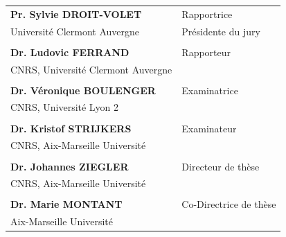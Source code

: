 \documentclass[
  a4paper,12pt,twoside,onecolumn,openright,final,oldfontcommands]{memoir}
\newcommand\titel[1]{{\usefont{T1}{tit}{el}{n} #1 }}
\begin{document}
\begin{center}
\begin{minipage}[t]{.6\linewidth}
	    \vspace{1em}
      \noindent\begin{tabular}{@{}p{16em} p{14em}}
        \textbf{Pr. Sylvie DROIT-VOLET} & Rapportrice\\
      	Université Clermont Auvergne & Présidente du jury\\
        \\
      	\textbf{Dr. Ludovic FERRAND} & Rapporteur\\
      	CNRS, Université Clermont Auvergne\\
        \\
      	\textbf{Dr. Véronique BOULENGER} & Examinatrice\\
      	CNRS, Université Lyon 2\\
      	\\
        \textbf{Dr. Kristof STRIJKERS} & Examinateur\\
      	CNRS, Aix-Marseille Université\\
        \\
      	\textbf{Dr. Johannes ZIEGLER} & Directeur de thèse\\
      	CNRS, Aix-Marseille Université\\
      	\\
      	\textbf{Dr. Marie MONTANT} & Co-Directrice de thèse\\
      	Aix-Marseille Université\\
      \end{tabular}
	\end{minipage}\hfill
\end{center}


\end{document}
